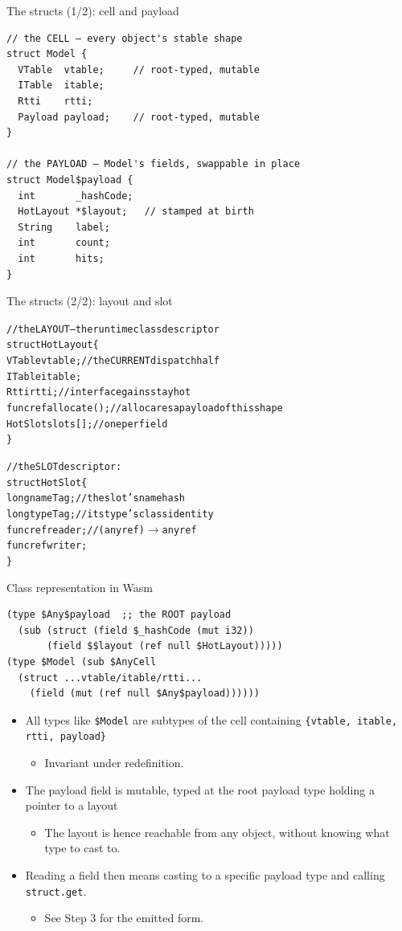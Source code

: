 \documentclass[10pt,presentation]{beamer}
\begin{document}
\begin{frame}[label={sec:org47af6a8},fragile]{The structs (1/2): cell and payload}
 \small
\begin{verbatim}
// the CELL — every object's stable shape
struct Model {
  VTable  vtable;     // root-typed, mutable
  ITable  itable;
  Rtti    rtti;
  Payload payload;    // root-typed, mutable
}

// the PAYLOAD — Model's fields, swappable in place
struct Model$payload {
  int       _hashCode;
  HotLayout *$layout;   // stamped at birth
  String    label;
  int       count;
  int       hits;
}
\end{verbatim}
\normalsize
\end{frame}
\begin{frame}[label={sec:orgc9d580d},fragile]{The structs (2/2): layout and slot}
\small
\begin{alltt}
// the LAYOUT — the runtime class descriptor
struct HotLayout \{
  VTable  vtable;     // the CURRENT dispatch half
  ITable  itable;
  Rtti    rtti;       // interface gains stay hot
  funcref allocate(); // allocares a payload of this shape
  HotSlot slots[];    // one per field
\}

// the SLOT descriptor:
struct HotSlot \{
  long    nameTag;    // the slot's name hash
  long    typeTag;    // its type's class identity
  funcref reader;     // (anyref) \ensuremath{\to} anyref
  funcref writer;
\}
\end{alltt}
\normalsize
\end{frame}
\begin{frame}[label={sec:org55ff7d0},fragile]{Class representation in Wasm}
 \begin{verbatim}
(type $Any$payload  ;; the ROOT payload
  (sub (struct (field $_hashCode (mut i32))
       (field $$layout (ref null $HotLayout)))))
(type $Model (sub $AnyCell
  (struct ...vtable/itable/rtti...
    (field (mut (ref null $Any$payload))))))
\end{verbatim}
\begin{itemize}
\item All types like \texttt{\$Model} are subtypes of the \alert{cell} containing
\texttt{\{vtable, itable, rtti, payload\}}
\begin{itemize}
\item Invariant under redefinition.
\end{itemize}
\item The payload field is mutable, typed at the \alert{root} payload type
holding a pointer to a layout
\begin{itemize}
\item The layout is hence reachable from \alert{any} object, without knowing
what type to cast to.
\end{itemize}
\item Reading a field then means casting to a specific payload type and
calling \texttt{struct.get}.
\begin{itemize}
\item See Step 3 for the emitted form.
\end{itemize}
\end{itemize}
\end{frame}
\end{document}
